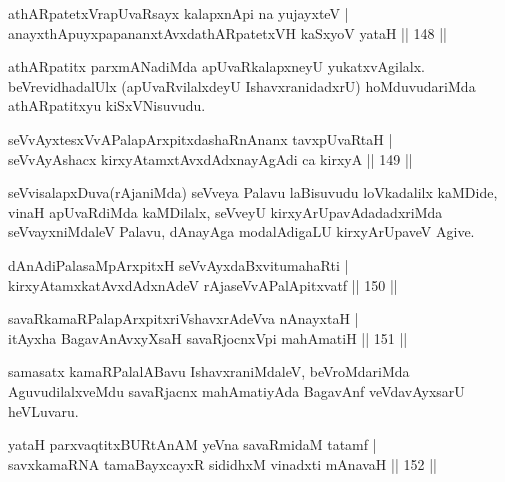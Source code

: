 \begin{shl}
athARpatetxVrapUvaRsayx kalapxnA\s pi na yujayxteV |\\
anayxthA\s puyxpapananxtAvxdathARpatetxVH kaSxyoV yataH \hfill || 148 ||
\end{shl}

\begin{artha}
athARpatitx parxmANadiMda apUvaRkalapxneyU yukatxvAgilalx. beVrevidhadalUlx (apUvaRvilalxdeyU IshavxranidadxrU) hoMduvudariMda athARpatitxyu kiSxVNisuvudu.
\end{artha}

\begin{shl}
seVvAyxtesxVvAPalapArxpitxdashaRnAnanx tavxpUvaRtaH |\\
seVvAyAshacx kirxyAtamxtAvxdAdxnayAgAdi ca kirxyA \hfill || 149 ||
\end{shl}

\begin{artha}
seVvisalapxDuva(rAjaniMda) seVveya Palavu laBisuvudu loVkadalilx kaMDide, vinaH apUvaRdiMda kaMDilalx, seVveyU kirxyArUpavAdadadxriMda seVvayxniMdaleV Palavu, dAnayAga modalAdigaLU kirxyArUpaveV Agive.
\end{artha}


\begin{shl}
dAnAdiPalasaMpArxpitxH seVvAyxdaBxvitumahaRti |\\
kirxyAtamxkatAvxdAdxnAdeV rAjaseVvAPalApitxvatf \hfill || 150 ||
\end{shl}

\begin{shl}
savaRkamaRPalapArxpitxriVshavxrAdeVva nAnayxtaH |\\
itAyxha BagavAnAvxyXsaH savaRjocnxV\s pi mahAmatiH \hfill || 151 ||
\end{shl}

\begin{artha}%
samasatx kamaRPalalABavu IshavxraniMdaleV, beVroMdariMda AguvudilalxveMdu savaRjacnx mahAmatiyAda BagavAnf veVdavAyxsarU heVLuvaru.
\end{artha}


\begin{shl}
yataH parxvaqtitxBURtAnAM yeVna savaRmidaM tatamf |\\
savxkamaRNA tamaBayxcayxR sididhxM vinadxti mAnavaH \hfill || 152 ||
\end{shl}

